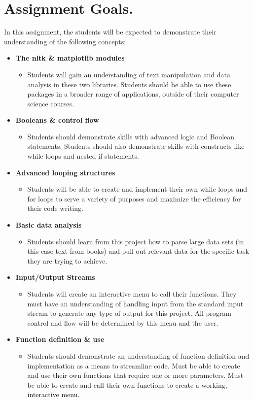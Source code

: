 \documentclass[11pt, letterpaper, onecolumn, oneside, final]{article}
\begin{document}
    \maketitle
\section{Assignment Goals.} 
In this assignment, the students will be expected to demonstrate their understanding of the following concepts:
\begin{itemize}
\item \textbf{The {\consolas nltk} \& {\consolas matplotlib} modules}
\begin{itemize}
\item Students will gain an understanding of text manipulation and data analysis in these two libraries. Students should be able to use these packages in a broader range of applications, outside of their computer science courses.
\end{itemize}
\item \textbf{Booleans \& control flow}
\begin{itemize}
\item Students should demonstrate skills with advanced logic and Boolean statements. Students should also demonstrate skills with constructs like while loops and nested if statements.
\end{itemize}
\item \textbf{Advanced looping structures}
\begin{itemize}
\item Students will be able to create and implement their own while loops and for loops to serve a variety of purposes and maximize the efficiency for their code writing.
\end{itemize}
\item \textbf{Basic data analysis}
\begin{itemize}
\item Students should learn from this project how to parse large data sets (in this case text from books) and pull out relevant data for the specific task they are trying to achieve.
\end{itemize}
\item \textbf{Input/Output Streams}
\begin{itemize}
\item Students will create an interactive menu to call their functions. They must have an understanding of handling input from the standard input stream to generate any type of output for this project. All program control and flow will be determined by this menu and the user.
\end{itemize}
\item \textbf{Function definition \& use}
\begin{itemize}
\item Students should demonstrate an understanding of function definition and implementation as a means to streamline code. Must be able to create and use their own functions that require one or more parameters. Must be able to create and call their own functions to create a working, interactive menu. 
\end{itemize}
\end{itemize}
\end{document}
